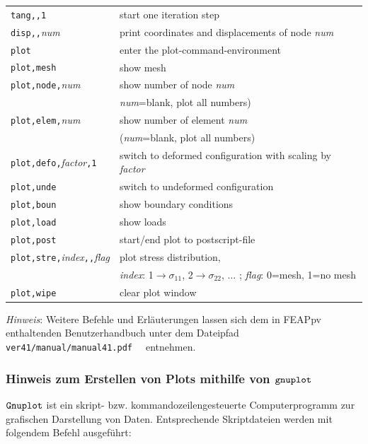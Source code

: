 \begin{tabular}{ll}
\verb/tang,,1/ & start one iteration step\\
\verb/disp,,/{\sl num} & print coordinates and displacements of node {\sl num}\\
\verb/plot/    & enter the plot-command-environment\\
\verb/plot,/\verb/mesh/    & show mesh\\
\verb/plot,/\verb/node,/{\sl num}    & show number of node {\sl num}\\
& {\sl num}=blank, plot all numbers)\\
\verb/plot,/\verb/elem,/{\sl num}    & show number of element {\sl num}\\
& ({\sl num}=blank, plot all numbers)\\
\verb/plot,/\verb/defo,/{\sl factor}\verb/,1/ & switch to deformed configuration with scaling by {\sl factor}\\
\verb/plot,/\verb/unde/    & switch to undeformed configuration\\
\verb/plot,/\verb/boun/    & show boundary conditions\\
\verb/plot,/\verb/load/    & show loads\\
\verb/plot,/\verb/post/    & start/end plot to postscript-file\\
\verb/plot,/\verb/stre,/{\sl index}\verb/,,/{\sl flag} & plot stress distribution,\\
& {\sl index}: 1$\rightarrow\sigma_{11}$, 2$\rightarrow\sigma_{22}$, $\ldots$ ;
{\sl flag}: 0=mesh, 1=no mesh\\
\verb/plot,/\verb/wipe/    & clear plot window
\end{tabular}\medskip

\textit{Hinweis}:
Weitere Befehle und Erläuterungen lassen sich dem in FEAPpv enthaltenden Benutzerhandbuch unter dem Dateipfad 
\verb| ver41/manual/manual41.pdf  | entnehmen.

\medskip




\subsubsection*{Hinweis zum Erstellen von Plots mithilfe von $\tt gnuplot$}

$\tt Gnuplot$ ist ein skript- bzw. kommandozeilengesteuerte Computerprogramm zur grafischen Darstellung von Daten.
Entsprechende Skriptdateien werden mit folgendem Befehl ausgeführt:

